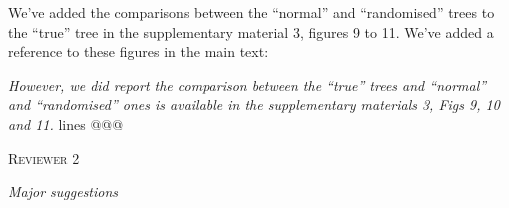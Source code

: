 \documentclass[12pt,letterpaper]{article}
\renewcommand{\section}[1]{%
\bigskip
\begin{center}
\begin{Large}
\normalfont\scshape #1
\medskip
\end{Large}
\end{center}}
\renewcommand{\subsection}[1]{%
\bigskip
\begin{center}
\begin{large}
\normalfont\itshape #1
\end{large}
\end{center}}
\begin{document}
\begin{enumerate}
We've added the comparisons between the ``normal'' and ``randomised'' trees to the ``true'' tree in the supplementary material 3, figures 9 to 11.
We've added a reference to these figures in the main text:

\textit{However, we did report the comparison between the ``true'' trees and ``normal'' and ``randomised'' ones is available in the supplementary materials 3, Figs 9, 10 and 11.} lines @@@

\end{enumerate}





%
%





\section{Reviewer 2}

\subsection{Major suggestions}
\end{document}
